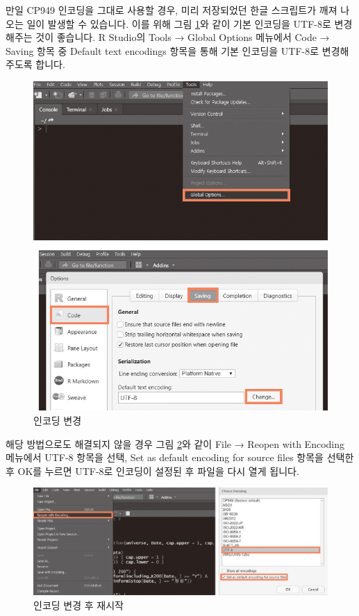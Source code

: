 \documentclass[12pt,]{book}
\begin{document}
만일 CP949 인코딩을 그대로 사용할 경우, 미리 저장되었던 한글 스크립트가 깨져 나오는 일이 발생할 수 있습니다. 이를 위해 그림 \ref{fig:utf1}와 같이 기본 인코딩을 UTF-8로 변경해주는 것이 좋습니다. R Studio의 Tools → Global Options 메뉴에서 Code → Saving 항목 중 Default text encodings 항목을 통해 기본 인코딩을 UTF-8로 변경해주도록 합니다.

\begin{figure}[h]

{\centering \includegraphics[width=1\linewidth]{images/utf_encoding_1} 

}

\caption{인코딩 변경}\label{fig:utf1}
\end{figure}

해당 방법으로도 해결되지 않을 경우 그림 \ref{fig:utf2}와 같이 File → Reopen with Encoding 메뉴에서 UTF-8 항목을 선택, Set as default encoding for source files 항목을 선택한 후 OK를 누르면 UTF-8로 인코딩이 설정된 후 파일을 다시 열게 됩니다.

\begin{figure}[h]

{\centering \includegraphics[width=1\linewidth]{images/utf_encoding_2} 

}

\caption{인코딩 변경 후 재시작}\label{fig:utf2}
\end{figure}
\end{document}

